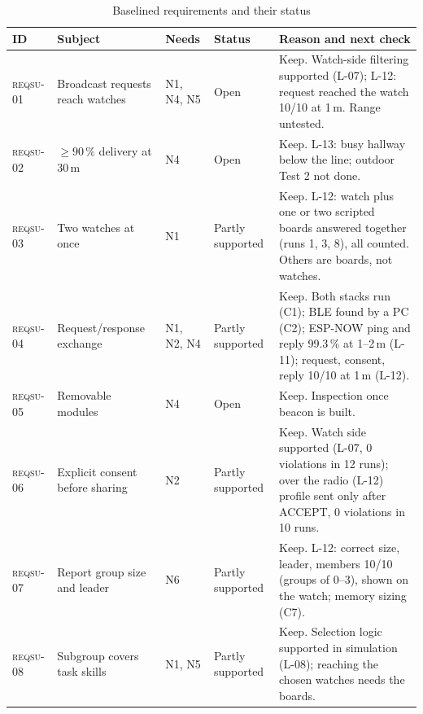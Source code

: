 \IfFileExists{IEEEtran.cls}{\documentclass[conference]{IEEEtran}}{\documentclass[10pt,twocolumn]{article}}
\newcommand{\req}[1]{\textsc{reqsu-}#1}
\begin{document}
\begin{table}[!t]
\caption{Baselined requirements and their status}
\centering\footnotesize
\begin{tabularx}{\textwidth}{@{}l l l l Y@{}}
\toprule
ID & Subject & Needs & Status & Reason and next check\\
\midrule
\req{01} & Broadcast requests reach watches & N1, N4, N5 & Open & Keep. Watch-side filtering supported (L-07); L-12: request reached the watch 10/10 at 1\,m. Range untested.\\
\req{02} & $\ge 90\,\%$ delivery at 30\,m & N4 & Open & Keep. L-13: busy hallway below the line; outdoor Test 2 not done.\\
\req{03} & Two watches at once & N1 & Partly supported & Keep. L-12: watch plus one or two scripted boards answered together (runs 1, 3, 8), all counted. Others are boards, not watches.\\
\req{04} & Request/response exchange & N1, N2, N4 & Partly supported & Keep. Both stacks run (C1); BLE found by a PC (C2); ESP-NOW ping and reply 99.3\,\% at 1--2\,m (L-11); request, consent, reply 10/10 at 1\,m (L-12).\\
\req{05} & Removable modules & N4 & Open & Keep. Inspection once beacon is built.\\
\req{06} & Explicit consent before sharing & N2 & Partly supported & Keep. Watch side supported (L-07, 0 violations in 12 runs); over the radio (L-12) profile sent only after ACCEPT, 0 violations in 10 runs.\\
\req{07} & Report group size and leader & N6 & Partly supported & Keep. L-12: correct size, leader, members 10/10 (groups of 0--3), shown on the watch; memory sizing (C7).\\
\req{08} & Subgroup covers task skills & N1, N5 & Partly supported & Keep. Selection logic supported in simulation (L-08); reaching the chosen watches needs the boards.\\
\bottomrule
\end{tabularx}

\end{table}
\end{document}
